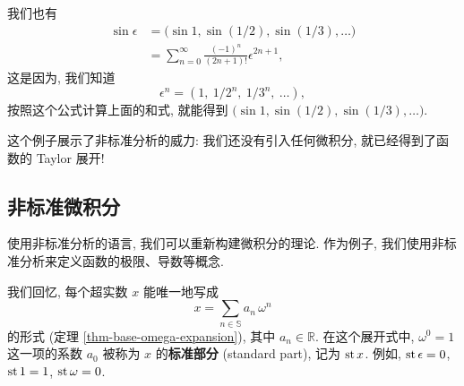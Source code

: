 \begin{example}
    我们也有
    \begin{align*}
        \sin \epsilon
        & = \bigl( \sin 1, \sin (1/2), \sin (1/3), \dotsc \bigr) \\
        & = \sum_{n=0}^\infty \frac{(-1)^n}{(2n + 1)!} \epsilon^{2n + 1},
    \end{align*}
    这是因为, 我们知道
    \[
        \epsilon^n = (1, \ 1 / 2^n, \ 1 / 3^n, \ \dotsc),
    \]
    按照这个公式计算上面的和式, 就能得到
    $\bigl( \sin 1, \sin (1/2), \sin (1/3), \dotsc \bigr)$.
    
    这个例子展示了非标准分析的威力:
    我们还没有引入任何微积分,
    就已经得到了函数的 Taylor 展开!
\end{example}



\subsection{非标准微积分}

使用非标准分析的语言, 我们可以重新构建微积分的理论.
作为例子, 我们使用非标准分析来定义函数的极限、导数等概念.

\begin{construction}
    我们回忆, 每个超实数 $x$ 能唯一地写成
    \[
        x = \sum_{n \in \mathbb{S}} a_n \, \omega^n
    \]
    的形式 (定理 \ref{thm-base-omega-expansion}), 其中 $a_n \in \mathbb{R}$.
    在这个展开式中, $\omega^0 = 1$ 这一项的系数 $a_0$
    被称为 $x$ 的\textbf{标准部分} (standard part),
    记为 $\operatorname{st} x$.
    例如, $\st \epsilon = 0$, $\operatorname{st} 1 = 1$, $\operatorname{st} \omega = 0$.
\end{construction}



